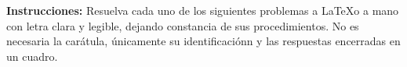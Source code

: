 

\usepackage{fancyhdr}%
\pagestyle{fancy}%
\fancyhead{}
\fancyhead[R]{\footnotesize{\thepage}}
\fancyfoot{}
\usepackage{fourier-orns}

\renewcommand\footrule{%
\hrulefill
\raisebox{-2.1pt}
{\quad\decosix\quad}%
\hrulefill}


\usepackage{esint}


\begin{titlepage}


\noindent \textbf{Instrucciones: } Resuelva cada uno de los siguientes problemas a \LaTeX  o a mano con letra clara y legible, dejando constancia de sus procedimientos. No es necesaria la carátula, únicamente su identificaciónn y las respuestas encerradas en un cuadro.



\end{titlepage}


